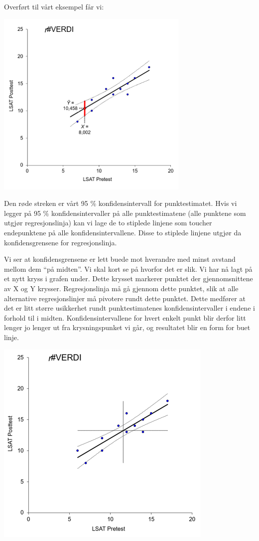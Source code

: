 \documentclass[
]{article}
\begin{document}
Overført til vårt eksempel får vi:

\includegraphics{Teori_fig9.png}

Den røde streken er vårt 95 \% konfidensintervall for punktestimatet.
Hvis vi legger på 95 \% konfidensintervaller på alle punktestimatene
(alle punktene som utgjør regresjonslinja) kan vi lage de to stiplede
linjene som toucher endepunktene på alle konfidensintervallene. Disse to
stiplede linjene utgjør da konfidensgrensene for regresjonslinja.

Vi ser at konfidensgrensene er lett buede mot hverandre med minst
avstand mellom dem ``på midten''. Vi skal kort se på hvorfor det er
slik. Vi har nå lagt på et nytt kryss i grafen under. Dette krysset
markerer punktet der gjennomsnittene av X og Y krysser. Regresjonslinja
må gå gjennom dette punktet, slik at alle alternative regresjonslinjer
må pivotere rundt dette punktet. Dette medfører at det er litt større
usikkerhet rundt punktestimatenes konfidensintervaller i endene i
forhold til i midten. Konfidensintervallene for hvert enkelt punkt blir
derfor litt lenger jo lenger ut fra krysningspunket vi går, og
resultatet blir en form for buet linje.

\includegraphics{Teori_fig10.png}
\end{document}
